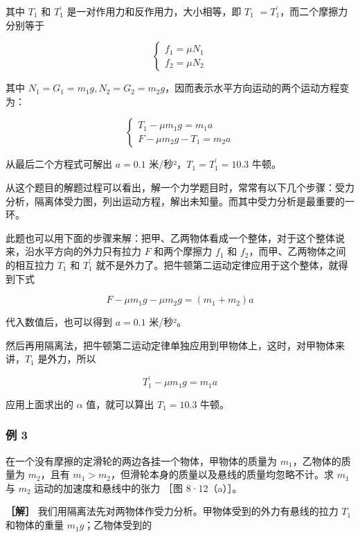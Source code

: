 其中 \(T_{1}\) 和 \(T_{1}^{\prime}\)
是一对作用力和反作用力，大小相等，即 \(T_{1}\)
\(=T_{1}^{\prime}\)，而二个摩擦力分别等于

\[
\left\{ \begin{array}{l} f _ {1} = \mu N _ {1} \\ f _ {2} = \mu N _ {2} \end{array} \right.
\]

其中
\(N_{1} = G_{1} = m_{1}g, N_{2} = G_{2} = m_{2}g\)，因而表示水平方向运动的两个运动方程变为：

\[
\left\{ \begin{array}{l} T _ {1} - \mu m _ {1} g = m _ {1} a \\ F - \mu m _ {2} g - T _ {1} = m _ {2} a \end{array} \right.
\]

从最后二个方程式可解出 \(a = 0.1\)
米/秒²，\(T_{1} = T_{1}^{\prime} = 10.3\) 牛顿。

从这个题目的解题过程可以看出，解一个力学题目时，常常有以下几个步骤：受力分析，隔离体受力图，列出运动方程，解出未知量。而其中受力分析是最重要的一环。

此题也可以用下面的步骤来解：把甲、乙两物体看成一个整体，对于这个整体说来，沿水平方向的外力只有拉力
\(F\) 和两个摩擦力 \(f_{1}\) 和 \(f_{2}\)，而甲、乙两物体之间的相互拉力
\(T_{1}\) 和 \(T_{1}^{\prime}\)
就不是外力了。把牛顿第二运动定律应用于这个整体，就得到下式

\[
F - \mu m _ {1} g - \mu m _ {2} g = (m _ {1} + m _ {2}) a
\]

代入数值后，也可以得到 \(a = 0.1\) 米/秒²。

然后再用隔离法，把牛顿第二运动定律单独应用到甲物体上，这时，对甲物体来讲，\(T_{1}\)
是外力，所以

\[
T _ {1} ^ {\prime} - \mu m _ {1} g = m _ {1} a
\]

应用上面求出的 \(\alpha\) 值，就可以算出 \(T_{1} = 10.3\) 牛顿。

\subsubsection{例 3}\label{ux4f8b-3-6}

在一个没有摩擦的定滑轮的两边各挂一个物体，甲物体的质量为
\(m_{1}\)，乙物体的质量为 \(m_{2}\)，且有
\(m_{1} > m_{2}\)，但滑轮本身的质量以及悬线的质量均忽略不计。求
\(m_{1}\) 与 \(m_{2}\) 运动的加速度和悬线中的张力 ［图 8·12（a）］。

\textbf{［解］}
我们用隔离法先对两物体作受力分析。甲物体受到的外力有悬线的拉力 \(T_{1}\)
和物体的重量 \(m_{1}g\)；乙物体受到的

